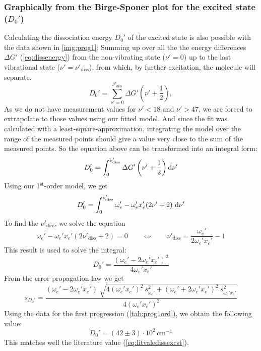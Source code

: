\subsubsection{Graphically from the Birge-Sponer plot for the excited state ($D_0'$)}
Calculating the dissociation energy $ D_0'$ of the excited state
is also possible with the data shown in \autoref{img:prog1}:
Summing up over all the
the energy differences $\Delta G'$ (\autoref{eq:dissenergy}) from the non-vibrating state ($\nu'=0$) up to the last
vibrational state ($\nu'=\nu'_{\text{diss}}$), from which, by further excitation, the molecule will separate.
\begin{equation}
  D_0' = \sum_{\nu'=0}^{\nu'_{\text{diss}}} \Delta G' \left( \nu' + \frac{1}{2} \right),
\end{equation}
As we do not have measurement values for $\nu'<18$ and $\nu'>47$,
we are forced to extrapolate to those values using our fitted model.
And since the fit was calculated with a least-square-approximation,
integrating the model over the range of the measured points should give a value
very close to the sum of the measured points.
So the equation above can be transformed into an integral form:
\begin{equation}
  D_0' = \int_{0}^{\nu'_{\text{diss}}} \Delta G'\left( \nu' + \frac{1}{2} \right) \mathrm{d} \nu'
\end{equation}
Using our 1$^{\text{st}}$-order model, we get
\begin{equation}
D_0' = \int_{0}^{\nu'_{\text{diss}}} \omega_e' - \omega_e' x_e' (2\nu' + 2) \ \difd \nu'
\end{equation}
To find the $\nu'_{\text{diss}}$, we solve the equation
\begin{equation}
  \omega_e' - \omega_e' x_e' (2\nu'_{\text{diss}} + 2) = 0 \qquad \Leftrightarrow \qquad \nu'_{\text{diss}} =
  \frac{\omega_e'}{2\omega_e' x_e'} - 1
\end{equation}
This result is used to solve the integral:
\begin{equation}
  D_0' = \frac{(\omega_e'-2\omega_e' x_e')^2}{4\omega_e' x_e'}
\end{equation}
From the error propagation law we get
\begin{equation}
  s_{D_0'} = \frac
  {(\omega_e'-2\omega_e' x_e') \ \sqrt{4(\omega_e' x_e')^2 \ s_{\omega_e'}^2 + (\omega_e'+2\omega_e' x_e')^2 \ s_{\omega_e' x_e'}^2}}
  {4(\omega_e' x_e')^2}
\end{equation}
Using the data for the first progression (\autoref{tab:prog1ord}), we obtain the following value:
\begin{equation}
    D_0' = (42 \pm 3) \cdot 10^2\, \text{cm}^{-1}
    \end{equation}
This matches well the literature value (\autoref{eq:litvaledissexcst}).

